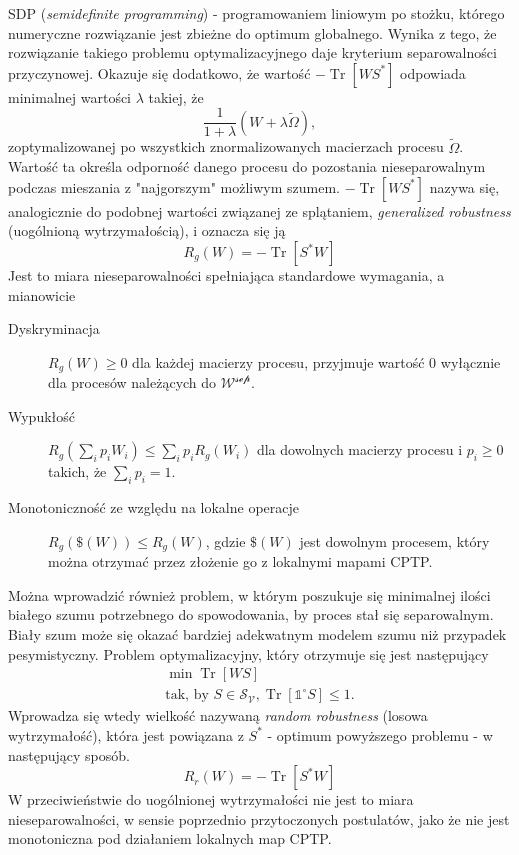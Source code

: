 \documentclass[10pt]{article} %
\DeclareMathOperator{\Trs}{Tr}
\newcommand{\IO}{\mathbb{1}^\circ}
\begin{document}
SDP (\textit{semidefinite programming}) - programowaniem liniowym po stożku, którego numeryczne rozwiązanie jest zbieżne do optimum globalnego.
Wynika z tego, że rozwiązanie takiego problemu optymalizacyjnego daje kryterium separowalności przyczynowej.
Okazuje się dodatkowo, że wartość $-\Trs \left[ W S^* \right]$ odpowiada minimalnej wartości $\lambda$ takiej, że 
\begin{equation}
\frac{1}{1 + \lambda}\left( W + \lambda\widetilde{\Omega}\right),
\end{equation}
zoptymalizowanej po wszystkich znormalizowanych macierzach procesu $\widetilde{\Omega}$. Wartość ta określa odporność danego procesu do pozostania nieseparowalnym podczas mieszania z "najgorszym" możliwym szumem. $-\Trs \left [ W S^* \right]$ nazywa się, analogicznie do podobnej wartości związanej ze splątaniem, \textit{generalized robustness} (uogólnioną wytrzymałością), i oznacza się ją
\begin{equation}
R_g(W) = -\Trs \left[ S^* W \right]
\end{equation} Jest to miara nieseparowalności spełniająca standardowe wymagania, a mianowicie
\begin{description}
\item[Dyskryminacja] $R_g(W) \geq 0$ dla każdej macierzy procesu, przyjmuje wartość 0 wyłącznie dla procesów należących do $\mathcal{W^{sep}}$. 
\item[Wypukłość] $R_g(\sum_i p_i W_i) \leq \sum_i p_i R_g(W_i)$ dla dowolnych macierzy procesu i $p_i \geq 0$ takich, że $\sum_i p_i = 1$. 
\item[Monotoniczność ze względu na lokalne operacje] $R_g\left(\$(W)\right) \leq R_g\left(W\right)$, gdzie $\$(W)$ jest dowolnym procesem, który można 
otrzymać przez złożenie go z lokalnymi mapami CPTP.
\end{description}
Można wprowadzić również problem, w którym poszukuje się minimalnej ilości białego szumu potrzebnego do spowodowania, by proces stał się separowalnym. Biały szum może się okazać bardziej adekwatnym modelem szumu niż przypadek pesymistyczny.
Problem optymalizacyjny, który otrzymuje się jest następujący
\begin{gather}
\min \Trs \left[ WS \right]\\
\text{tak, by } S \in \mathcal{S_V}, \Trs\left[\IO S\right] \leq 1.
\end{gather}
Wprowadza się wtedy wielkość nazywaną \textit{random robustness} (losowa wytrzymałość), która jest powiązana z $S^*$ - optimum powyższego problemu - w następujący sposób.
\begin{equation}
R_r(W) = -\Trs\left[S^* W\right]
\end{equation}
W przeciwieństwie do uogólnionej wytrzymałości nie jest to miara nieseparowalności, w sensie poprzednio przytoczonych postulatów, jako że nie jest monotoniczna pod działaniem lokalnych map CPTP.
\end{document}
